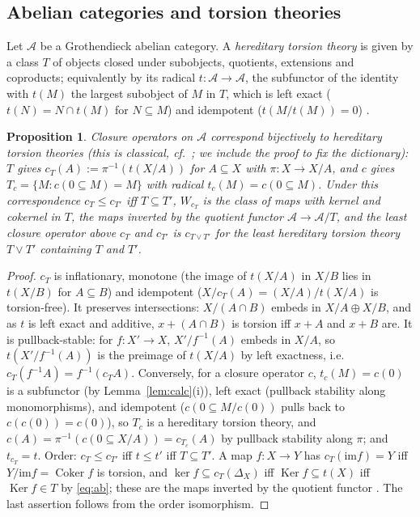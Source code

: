 \documentclass[11pt]{amsart}
\newtheorem{prop}[thm]{Proposition}
\theoremstyle{definition}
\newcommand{\im}{\mathrm{im}}
\begin{document}
\subsection{Abelian categories and torsion theories}\label{sub:abelian}
Let $\mathcal A$ be a Grothendieck abelian category. A \emph{hereditary
torsion theory} is given by a class $T$ of objects closed under subobjects,
quotients, extensions and coproducts; equivalently by its radical
$t\colon\mathcal A\to\mathcal A$, the subfunctor of the identity with $t(M)$ the
largest subobject of $M$ in $T$, which is left exact ($t(N)=N\cap t(M)$ for
$N\subseteq M$) and idempotent ($t(M/t(M))=0$) \cite{Gabriel,Stenstrom}.

\begin{prop}\label{prop:torsion}
Closure operators on $\mathcal A$ correspond bijectively to hereditary
torsion theories (this is classical, cf.\ \cite{DT,Stenstrom}; we include
the proof to fix the dictionary): $T$ gives $c_T(A):=\pi^{-1}(t(X/A))$ for $A\subseteq X$ with
$\pi\colon X\to X/A$, and $c$ gives $T_c=\{M:c(0\subseteq M)=M\}$ with radical
$t_c(M)=c(0\subseteq M)$. Under this correspondence $c_T\le c_{T'}$ iff
$T\subseteq T'$, $W_{c_T}$ is the class of maps with kernel and cokernel in
$T$, the maps inverted by the quotient functor $\mathcal A\to\mathcal A/T$,
and the least closure operator above $c_T$ and $c_{T'}$ is $c_{T\vee T'}$ for
the least hereditary torsion theory $T\vee T'$ containing $T$ and $T'$.
\end{prop}
\begin{proof}
$c_T$ is inflationary, monotone (the image of $t(X/A)$ in $X/B$ lies in
$t(X/B)$ for $A\subseteq B$) and idempotent ($X/c_T(A)=(X/A)/t(X/A)$ is
torsion-free). It preserves intersections: $X/(A\cap B)$ embeds in
$X/A\oplus X/B$, and as $t$ is left exact and additive, $x+(A\cap B)$ is
torsion iff $x+A$ and $x+B$ are. It is pullback-stable: for $f\colon X'\to X$,
$X'/f^{-1}(A)$ embeds in $X/A$, so $t(X'/f^{-1}(A))$ is the preimage of
$t(X/A)$ by left exactness, i.e.\ $c_T(f^{-1}A)=f^{-1}(c_TA)$. Conversely, for
a closure operator $c$, $t_c(M)=c(0)$ is a subfunctor (by
Lemma~\ref{lem:calc}(i)), left exact (pullback stability along
monomorphisms), and idempotent ($c(0\subseteq M/c(0))$ pulls back to $c(c(0))=
c(0)$), so $T_c$ is a hereditary torsion theory, and $c(A)=\pi^{-1}(c(0
\subseteq X/A))=c_{T_c}(A)$ by pullback stability along $\pi$; and
$t_{c_T}=t$. Order: $c_T\le c_{T'}$ iff $t\le t'$ iff $T\subseteq T'$. A map
$f\colon X\to Y$ has $c_T(\im f)=Y$ iff $Y/\im f=\operatorname{Coker}f$ is
torsion, and $\ker f\subseteq c_T(\Delta_X)$ iff $\operatorname{Ker}f\subseteq
t(X)$ iff $\operatorname{Ker}f\in T$ by \eqref{eq:ab}; these are the maps
inverted by the quotient functor \cite[III]{Gabriel}. The last assertion
follows from the order isomorphism.
\end{proof}
\end{document}
